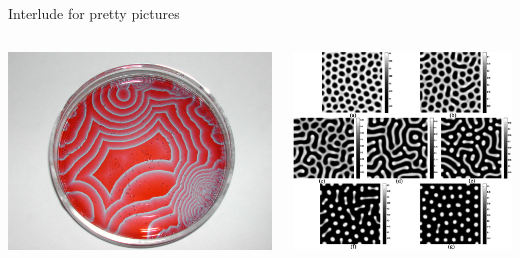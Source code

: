 \documentclass[presentation]{beamer}
\begin{document}
\begin{frame}[label={sec:org6564887}]{Interlude for pretty pictures}
\begin{columns}
\begin{column}{0.5\columnwidth}
\begin{center}
\includegraphics[width=.9\linewidth]{./BZ.jpg}
\end{center}
\end{column}

\begin{column}{0.5\columnwidth}
\begin{center}
\includegraphics[width=.9\linewidth]{./turingpatterns.png}
\end{center}
\end{column}
\end{columns}
\end{frame}
\end{document}
